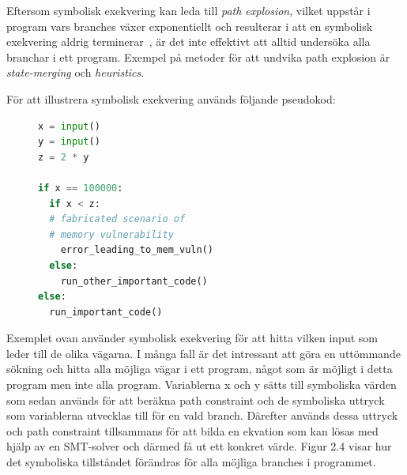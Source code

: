 Eftersom symbolisk exekvering kan leda till \emph{path explosion}, vilket
uppstår i program vars branches växer exponentiellt och resulterar i att en
symbolisk exekvering aldrig terminerar~\cite{path_explo}, är det inte effektivt 
att alltid undersöka alla branchar i ett program. Exempel på metoder för att undvika 
path explosion är \emph{state-merging} och \emph{heuristics}. 

För att illustrera symbolisk exekvering används följande pseudokod:

\begin{figure}[H]
\centering
\begin{lstlisting}[label={list:first}, language=Python, frame=single]
x = input()
y = input()
z = 2 * y

if x == 100000: 
  if x < z:
  # fabricated scenario of 
  # memory vulnerability
    error_leading_to_mem_vuln()
  else:
    run_other_important_code()
else:
  run_important_code()

\end{lstlisting}
\caption{}
\end{figure}

Exemplet ovan använder symbolisk exekvering för att hitta vilken input som leder
till de olika vägarna. I många fall är det intressant att göra en uttömmande
sökning och hitta alla möjliga vägar i ett program, något som är möjligt i detta
program men inte alla program. Variablerna x och y sätts till symboliska
värden som sedan används för att beräkna path constraint och de symboliska
uttryck som variablerna utvecklas till för en vald branch. Därefter används
dessa uttryck och path constraint tillsammans för att bilda en ekvation som kan
lösas med hjälp av en SMT-solver och därmed få ut ett konkret värde. Figur 2.4
visar hur det symboliska tillståndet förändras för alla möjliga branches i
programmet.

